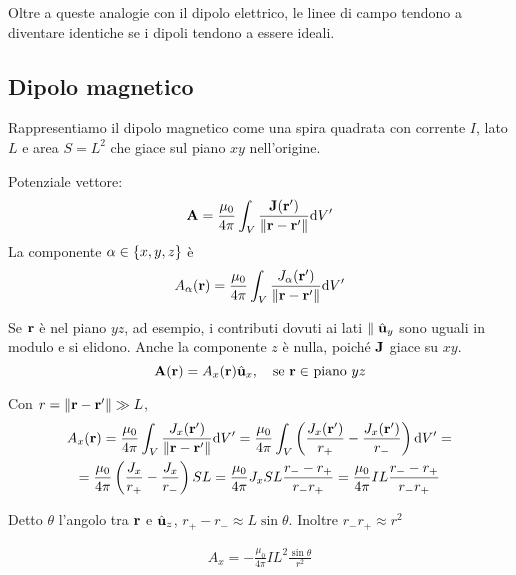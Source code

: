 Oltre a queste analogie con il dipolo elettrico, le linee di campo tendono a diventare identiche se i dipoli tendono a essere ideali.


\subsection{Dipolo magnetico}


Rappresentiamo il dipolo magnetico come una spira quadrata con corrente $I$, lato $L$ e area $S = L^2$ che giace sul piano $xy$ nell'origine.

Potenziale vettore:
\begin{equation}
    \mathbf{A} = \frac{\mu_0}{4\pi} \int_V \frac{\mathbf{J}(\mathbf{r}')}{\left\lVert \mathbf{r} - \mathbf{r}' \right\rVert} \mathrm{d} V'
\end{equation}
La componente $\alpha \in \left\{ x, y, z \right\}$ è
\begin{equation}
    A_\alpha(\mathbf{r}) = \frac{\mu_0}{4\pi} \int_V \frac{J_\alpha(\mathbf{r}')}{\left\lVert \mathbf{r} - \mathbf{r}' \right\rVert} \mathrm{d} V'
\end{equation}

Se $\mathbf{r}$ è nel piano $yz$, ad esempio, i contributi dovuti ai lati $\parallel \hat{\mathbf{u}}_{y}$ sono uguali in modulo e si elidono.
Anche la componente $z$ è nulla, poiché $\mathbf{J}$ giace su $xy$.
\begin{equation}
    \mathbf{A}(\mathbf{r}) = A_x(\mathbf{r}) \hat{\mathbf{u}}_{x}, \quad \text{se $\mathbf{r} \in$ piano $yz$}
\end{equation}

Con $r = \left\lVert \mathbf{r} - \mathbf{r}' \right\rVert \gg L$,
\begin{equation}
\begin{gathered}
    A_x(\mathbf{r}) = \frac{\mu_0}{4\pi} \int_V \frac{J_x(\mathbf{r}')}{\left\lVert \mathbf{r} - \mathbf{r}' \right\rVert} \mathrm{d} V'
    = \frac{\mu_0}{4\pi} \int_V \left( \frac{J_x(\mathbf{r}')}{r_+} - \frac{J_x(\mathbf{r}')}{r_-} \right) \mathrm{d} V' = \\
    = \frac{\mu_0}{4\pi} \left( \frac{J_x}{r_+} - \frac{J_x}{r_-} \right) SL
    = \frac{\mu_0}{4\pi} J_x S L \frac{r_- - r_+}{r_- r_+}
    = \frac{\mu_0}{4\pi} I L \frac{r_- - r_+}{r_- r_+}
\end{gathered}
\end{equation}

Detto $\theta$ l'angolo tra $\mathbf{r}$ e $\hat{\mathbf{u}}_{z}$, $r_+ - r_- \approx L \sin \theta$.
Inoltre $r_- r_+ \approx r^2$

\begin{gather}
    A_x = -\frac{\mu_0}{4\pi} I L^2 \frac{\sin\theta}{r^2}
\end{gather}

